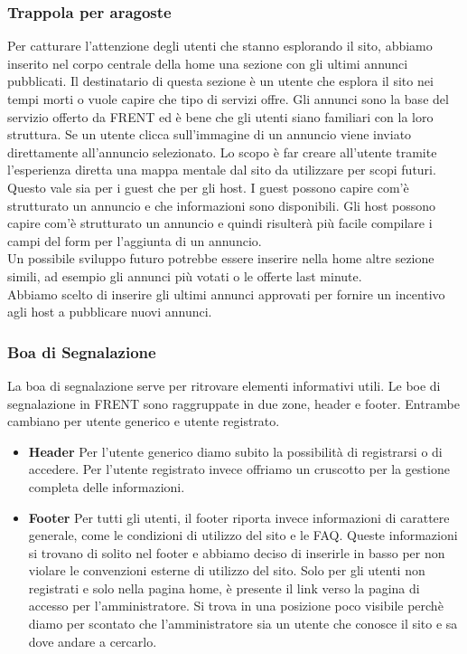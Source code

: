 \documentclass[1_relazione.tex]{subfiles}
\begin{document}
\subsubsection{Trappola per aragoste} 
Per catturare l'attenzione degli utenti che stanno esplorando il sito, abbiamo inserito nel corpo centrale della home una sezione con gli ultimi annunci pubblicati. Il destinatario di questa sezione è un utente che esplora il sito nei tempi morti o vuole capire che tipo di servizi offre. Gli annunci sono la base del servizio offerto da FRENT ed è bene che gli utenti siano familiari con la loro struttura. Se un utente clicca sull'immagine di un annuncio viene inviato direttamente all'annuncio selezionato. Lo scopo \`{e} far creare all'utente tramite l'esperienza diretta una mappa mentale dal sito da utilizzare per scopi futuri. \\
Questo vale sia per i guest che per gli host. I guest possono capire com'\`{e} strutturato un annuncio e che informazioni sono disponibili. Gli host possono capire com'\`{e} strutturato un annuncio e quindi risulter\`{a} pi\`{u} facile compilare i campi del form per l'aggiunta di un annuncio. \\
Un possibile sviluppo futuro potrebbe essere inserire nella home altre sezione simili, ad esempio gli annunci pi\`{u} votati o le offerte last minute.\\ Abbiamo scelto di inserire gli ultimi annunci approvati per fornire un incentivo agli host a pubblicare nuovi annunci. \\

    \subsubsection{Boa di Segnalazione}
    La boa di segnalazione serve per ritrovare elementi informativi utili. Le boe di segnalazione in FRENT sono raggruppate in due zone, header e footer. Entrambe cambiano per utente generico e utente registrato.

    \begin{itemize}
        \item \textbf{Header}
        Per l'utente generico diamo subito la possibilit\`{a} di registrarsi o di accedere. Per l'utente registrato invece offriamo un cruscotto per la gestione completa delle informazioni.
        \item \textbf{Footer}
        Per tutti gli utenti, il footer riporta invece informazioni di carattere generale, come le condizioni di utilizzo del sito e le FAQ. Queste informazioni si trovano di solito nel footer e abbiamo deciso di inserirle in basso per non violare le convenzioni esterne di utilizzo del sito. Solo per gli utenti non registrati e solo nella pagina home, \`{e} presente il link verso la pagina di accesso per l'amministratore. Si trova in una posizione poco visibile perch\`{e} diamo per scontato che l'amministratore sia un utente che conosce il sito e sa dove andare a cercarlo.
    \end{itemize}
\end{document}
